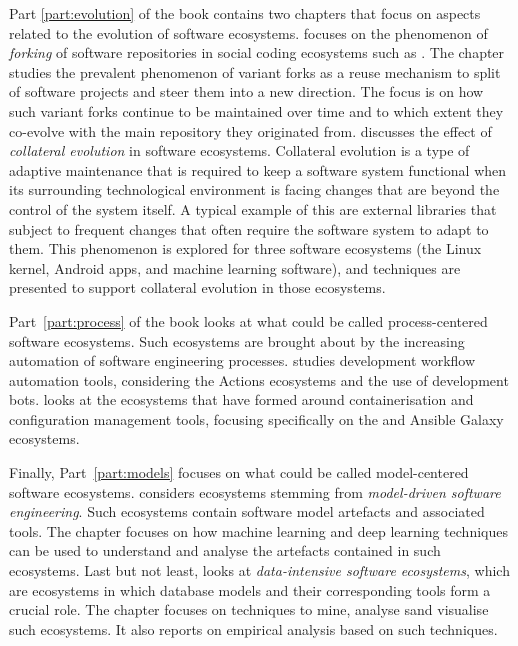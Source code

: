 Part \ref{part:evolution} of the book contains two chapters that focus on aspects related to the evolution of software ecosystems.
 focuses on the phenomenon of \emph{forking} of software repositories in social coding ecosystems such as \github. The chapter studies the prevalent phenomenon of variant forks as a reuse mechanism to split of software projects and steer them into a new direction. The focus is on how such variant forks continue to be maintained over time and to which extent they co-evolve with the main repository they originated from.
 discusses the effect of \emph{collateral evolution} in software ecosystems. Collateral evolution is a type of adaptive maintenance \cite{LientzSwanson1980,Chapin2001} that is required to keep a software system functional when its surrounding technological environment is facing changes that are beyond the control of the system itself. A typical example of this are external libraries that subject to frequent changes that often require the software system to adapt to them. This phenomenon is explored for three software ecosystems (the Linux kernel, Android apps, and machine learning software), and techniques are presented to support collateral evolution in those ecosystems.


Part~\ref{part:process} of the book looks at what could be called process-centered software ecosystems. Such ecosystems are brought about by the increasing automation of software engineering processes.  studies development workflow automation tools, considering the \github Actions ecosystems and the use of development bots.
 looks at the ecosystems that have formed around containerisation and configuration management tools, focusing specifically on the \dockerhub and Ansible Galaxy ecosystems.

Finally, Part~\ref{part:models} focuses on what could be called model-centered software ecosystems.
 considers ecosystems stemming from \emph{model-driven software engineering}. Such ecosystems contain software model artefacts and associated tools. The chapter focuses on how machine learning and deep learning techniques can be used to understand and analyse the artefacts contained in such ecosystems.
Last but not least,  looks at \emph{data-intensive software ecosystems}, which are ecosystems in which database models and their corresponding tools form a crucial role. The chapter focuses on techniques to mine, analyse sand visualise such ecosystems. It also reports on empirical analysis based on such techniques.

